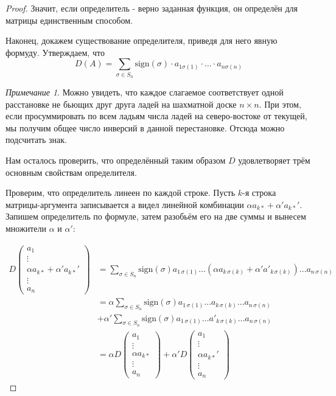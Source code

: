 \documentclass[a4paper,100pt]{article}
\theoremstyle{indented}
\theoremstyle{definition}
\theoremstyle{remark}
\newtheorem{remark}{Примечание}
\begin{document}
\begin{proof}
    Значит, если определитель - верно заданная функция, он определён для матрицы единственным способом.\ 

    Наконец, докажем существование определителя, приведя для него явную формуду. Утверждаем, что
    \[
        D(A)=\sum_{\sigma\in S_n} \text{sign}(\sigma)\cdot a_{1\sigma(1)}\cdot \dots\cdot a_{n\sigma(n)}
    \]

    \begin{remark}
        Можно увидеть, что каждое слагаемое соответствует одной расстановке не бьющих друг друга ладей на шахматной доске $n\times n$. При этом, если просуммировать по всем ладьям числа ладей на северо-востоке от текущей, мы получим общее число инверсий в данной перестановке. Отсюда можно подсчитать знак.
    \end{remark}

    Нам осталось проверить, что определённый таким образом $D$ удовлетворяет трём основным свойствам определителя.\ 

    Проверим, что определитель линеен по каждой строке. Пусть $k$-я строка матрицы-аргумента записывается а видел линейной комбинации $\alpha a_{k*}+\alpha'a_{k*}'$. Запишем определитель по формуле, затем разобьём его на две суммы и вынесем множители $\alpha$ и $\alpha'$:

    \begin{align*}
        D
        \begin{pmatrix}
            a_1\\
            \vdots\\
            \alpha a_{k*}+\alpha'a_{k*}'\\
            \vdots \\
            a_n
        \end{pmatrix} 
        & = \sum_{\sigma \in S_n} \text{sign}(\sigma) a_{1 \, \sigma(1)} \ldots (\alpha a_{k \, \sigma(k)} + \alpha' a'_{k \, \sigma(k)}) \ldots a_{n \, \sigma(n)} \\
        & = \alpha \sum_{\sigma \in S_n} \text{sign}(\sigma) a_{1 \, \sigma(1)} \ldots a_{k \, \sigma(k)} \ldots a_{n \, \sigma(n)}                             \\
        & + \alpha' \sum_{\sigma \in S_n} \text{sign}(\sigma) a_{1 \, \sigma(1)} \ldots a'_{k \, \sigma(k)} \ldots a_{n \, \sigma(n)}                           \\
        & =
       \alpha D
        \begin{pmatrix}
            a_1\\
            \vdots\\
            \alpha a_{k*}\\
            \vdots \\
            a_n
        \end{pmatrix}
        +\alpha' D
        \begin{pmatrix}
            a_1\\
            \vdots\\
            \alpha a_{k*}'\\
            \vdots \\
            a_n
        \end{pmatrix}
    \end{align*}


\end{proof}
\end{document}
